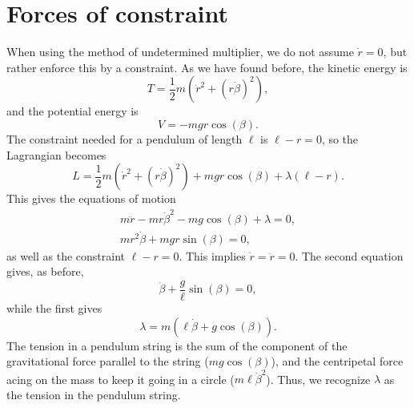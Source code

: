 \documentclass{article}
\begin{document}
    \section{Forces of constraint}
        When using the method of undetermined multiplier, we do not assume $\dot r = 0$, but rather enforce this by a constraint. As we have found before, the kinetic energy is 
        \begin{equation*}
            T = \frac{1}{2}m \left(\dot r^2 + (r \dot \beta)^2\right),
        \end{equation*}
        and the potential energy is 
        \begin{equation*}
            V = -mgr \cos(\beta).
        \end{equation*}
        The constraint needed for a pendulum of length $\ell$ is $\ell - r = 0$, so the Lagrangian becomes
        \begin{equation*}
            L = \frac{1}{2}m \left(\dot r^2 + (r \dot \beta)^2\right) + mgr \cos(\beta) + \lambda \left( \ell - r\right).
        \end{equation*}
        This gives the equations of motion
        \begin{align}
            m \ddot r - m r \dot \beta^2 - m g \cos(\beta) + \lambda = 0, \\
            m r^2 \dot \beta + mg r \sin(\beta) = 0,
        \end{align}
        as well as the constraint $\ell - r = 0$. This implies $\dot r = \ddot r = 0$. The second equation gives, as before,
        \begin{equation*}
            \dot \beta + \frac{g}{\ell} \sin(\beta) = 0,
        \end{equation*}
        while the first gives 
        \begin{equation*}
            \lambda = m(\ell \dot \beta + g \cos(\beta)).
        \end{equation*}
        The tension in a pendulum string is the sum of the component of the gravitational force parallel to the string ($mg \cos(\beta)$), and the centripetal force acing on the mass to keep it going in a circle ($m \ell \dot \beta^2$). Thus, we recognize $\lambda$ as the tension in the pendulum string.
\end{document}
